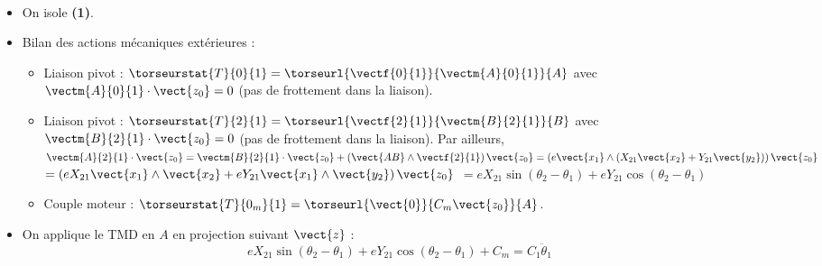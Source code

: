 \ifprof
\begin{corrige} ~\\
\begin{itemize}
\item On isole \textbf{(1)}.
\item Bilan des actions mécaniques extérieures :
\begin{itemize}
\item Liaison pivot : $\torseurstat{T}{0}{1}=\torseurl{\vectf{0}{1}}{\vectm{A}{0}{1}}{A}$ avec $\vectm{A}{0}{1}\cdot\vect{z_0}=0$ (pas de frottement dans la liaison).
\item Liaison pivot : $\torseurstat{T}{2}{1}=\torseurl{\vectf{2}{1}}{\vectm{B}{2}{1}}{B}$ avec $\vectm{B}{2}{1}\cdot\vect{z_0}=0$ (pas de frottement dans la liaison).
Par ailleurs, $\vectm{A}{2}{1}\cdot\vect{z_0}=\vectm{B}{2}{1}\cdot\vect{z_0}+\left(\vect{AB}\wedge\vectf{2}{1}\right) \vect{z_0}=\left(e\vect{x_1}\wedge\left(X_{21}\vect{x_2}+Y_{21}\vect{y_2}\right)\right)\vect{z_0}$
$=\left(eX_{21}\vect{x_1}\wedge \vect{x_2}+ eY_{21} \vect{x_1}\wedge \vect{y_2}\right)\vect{z_0} $
$=eX_{21}\sin \left( \theta_2 - \theta_1\right)+ eY_{21} \cos \left( \theta_2 - \theta_1\right) $

\item Couple moteur : $\torseurstat{T}{0_m}{1}=\torseurl{\vect{0}}{C_m\vect{z_0}}{A}$.
\end{itemize}
\item On applique le TMD en $A$ en projection suivant $\vect{z}$ :
$$
eX_{21}\sin \left( \theta_2 - \theta_1\right)+ eY_{21} \cos \left( \theta_2 - \theta_1\right) + C_m=C_1\ddot{\theta}_1
$$
\end{itemize}




\end{corrige}
